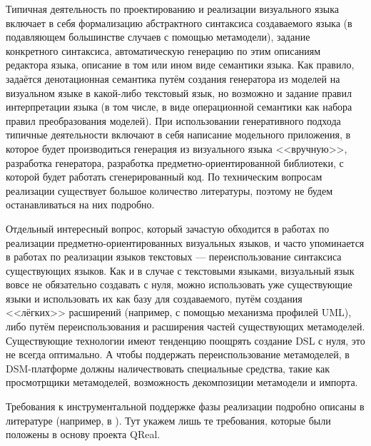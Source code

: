 Типичная деятельность по проектированию и реализации визуального языка включает в себя 
формализацию абстрактного синтаксиса создаваемого языка (в подавляющем большинстве случаев 
с помощью метамодели), задание конкретного синтаксиса, автоматическую генерацию по этим 
описаниям редактора языка, описание в том или ином виде семантики языка. Как правило, 
задаётся денотационная семантика путём создания генератора из моделей на визуальном языке 
в какой-либо текстовый язык, но возможно и задание правил интерпретации языка (в том числе, 
в виде операционной семантики как набора правил преобразования моделей). При использовании 
генеративного подхода типичные деятельности включают в себя написание модельного приложения, 
в которое будет производиться генерация из визуального языка <<вручную>>, разработка генератора, 
разработка предметно-ориентированной библиотеки, с которой будет работать сгенерированный код. 
По техническим вопросам реализации существует большое количество литературы, поэтому 
не будем останавливаться на них подробно.

Отдельный интересный вопрос, который зачастую обходится в работах по реализации предметно-ориентированных 
визуальных языков, и часто упоминается в работах по реализации языков текстовых --- переиспользование 
синтаксиса существующих языков. Как и в случае с текстовыми языками, визуальный язык 
вовсе не обязательно создавать с нуля, можно использовать уже существующие языки и 
использовать их как базу для создаваемого, путём создания <<лёгких>> расширений (например, 
с помощью механизма профилей UML), либо путём переиспользования и расширения частей 
существующих метамоделей. Существующие технологии имеют тенденцию поощрять создание DSL с нуля, 
это не всегда оптимально. А чтобы поддержать переиспользование метамоделей, в DSM-платформе 
должны наличествовать специальные средства, такие как просмотрщики метамоделей, возможность 
декомпозиции метамодели и импорта.

Требования к инструментальной поддержке фазы реализации подробно описаны в литературе 
(например, в \cite{kelly2008domain}). Тут укажем лишь те требования, которые были 
положены в основу проекта QReal.

